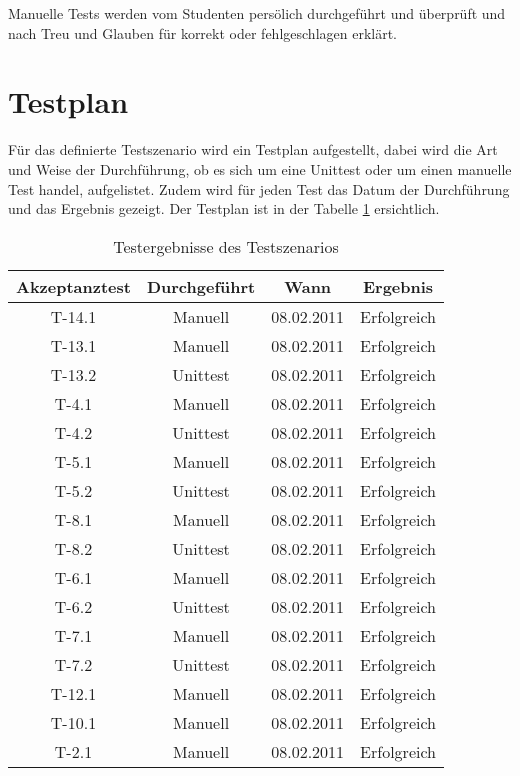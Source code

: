 \documentclass[abstracton, listof=totocnumbered,
bibliography=totocnumbered]{scrreprt}
\begin{document}
  Manuelle Tests werden vom Studenten persölich durchgeführt und überprüft und
  nach Treu und Glauben für korrekt oder fehlgeschlagen erklärt.
  
  \section{Testplan}
  
  Für das definierte Testszenario wird ein Testplan aufgestellt, dabei wird die
  Art und Weise der Durchführung, ob es sich um eine Unittest oder um einen
  manuelle Test handel, aufgelistet. Zudem wird für jeden Test das Datum der
  Durchführung und das Ergebnis gezeigt. Der Testplan ist in der Tabelle
  \ref{tab:testergebnisse} ersichtlich.
  \newline

  \enlargethispage{3cm}

  \begin{table}[h]
    \begin{center}
      \begin{tabular}{cccc}
        \toprule
        Akzeptanztest & Durchgeführt & Wann & Ergebnis \\
        \midrule
        T-14.1 & Manuell & 08.02.2011 & Erfolgreich \\
        T-13.1 & Manuell & 08.02.2011 & Erfolgreich \\
        T-13.2 & Unittest & 08.02.2011 & Erfolgreich \\
        T-4.1 & Manuell & 08.02.2011 & Erfolgreich \\
        T-4.2 & Unittest & 08.02.2011 & Erfolgreich \\
        T-5.1 & Manuell & 08.02.2011 & Erfolgreich \\
        T-5.2 & Unittest & 08.02.2011 & Erfolgreich \\
        T-8.1 & Manuell & 08.02.2011 & Erfolgreich \\
        T-8.2 & Unittest & 08.02.2011 & Erfolgreich \\
        T-6.1 & Manuell & 08.02.2011 & Erfolgreich \\
        T-6.2 & Unittest & 08.02.2011 & Erfolgreich \\
        T-7.1 & Manuell & 08.02.2011 & Erfolgreich \\
        T-7.2 & Unittest & 08.02.2011 & Erfolgreich \\
        T-12.1 & Manuell & 08.02.2011 & Erfolgreich \\
        T-10.1 & Manuell & 08.02.2011 & Erfolgreich \\
        T-2.1 & Manuell & 08.02.2011 & Erfolgreich \\
        \bottomrule
      \end{tabular}
      \caption{Testergebnisse des Testszenarios}
      \label{tab:testergebnisse}
     \end{center}  
  \end{table}
  
\end{document}
